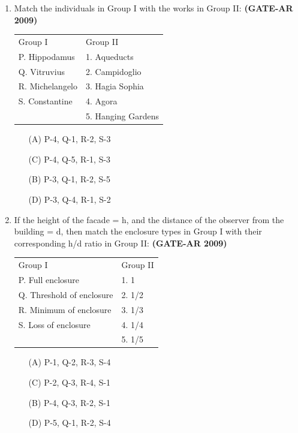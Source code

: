 \documentclass[a4paper,10pt]{article}
\begin{document}
\begin{enumerate}
    \item Match the individuals in Group I with the works in Group II: \hfill \textbf{(GATE-AR 2009)} \\
    \begin{tabular}{ p p }
	Group I & Group II \\
	P. Hippodamus & 1. Aqueducts \\
	Q. Vitruvius & 2. Campidoglio \\
	R. Michelangelo & 3. Hagia Sophia \\
	S. Constantine & 4. Agora \\
	& 5. Hanging Gardens \\
	\end{tabular}
	\begin{multicols}{2}
	\begin{itemize}
        \item[(A)] P-4, Q-1, R-2, S-3
        \item[(C)] P-4, Q-5, R-1, S-3
        \item[(B)] P-3, Q-1, R-2, S-5
        \item[(D)] P-3, Q-4, R-1, S-2
    \end{itemize}
	\end{multicols}
    
    \item If the height of the facade = h, and the distance of the observer from the building = d, then match the enclosure types in Group I with their corresponding h/d ratio in Group II: \hfill \textbf{(GATE-AR 2009)} \\
    \begin{tabular}{ p p }
	Group I & Group II \\
	P. Full enclosure & 1. 1 \\
	Q. Threshold of enclosure & 2. 1/2 \\
	R. Minimum of enclosure & 3. 1/3 \\
	S. Loss of enclosure & 4. 1/4 \\
	& 5. 1/5 \\
	\end{tabular}
	\begin{multicols}{2}
	\begin{itemize}
        \item[(A)] P-1, Q-2, R-3, S-4
        \item[(C)] P-2, Q-3, R-4, S-1
        \item[(B)] P-4, Q-3, R-2, S-1
        \item[(D)] P-5, Q-1, R-2, S-4
    \end{itemize}
	\end{multicols}


\end{enumerate}
\end{document}
